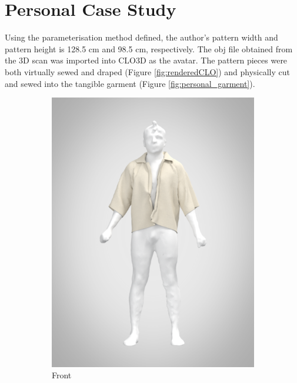 \section{Personal Case Study}
Using the parameterisation method defined, the author's pattern width and pattern height is 128.5 cm and 98.5 cm, respectively. The obj file obtained from the 3D scan was imported into CLO3D as the avatar. The pattern pieces were both virtually sewed and draped (Figure \ref{fig:renderedCLO}) and physically cut and sewed into the tangible garment (Figure \ref{fig:personal_garment}).

\begin{figure}[H]
    \centering
    \begin{subfigure}[b]{0.3\textwidth}
        \centering
        \includegraphics[width=\textwidth]{Images/renderfront.png}
        \caption{Front}
    \end{subfigure}
    \hfill
    \begin{subfigure}[b]{0.3\textwidth}

\end{subfigure}
\end{figure}
